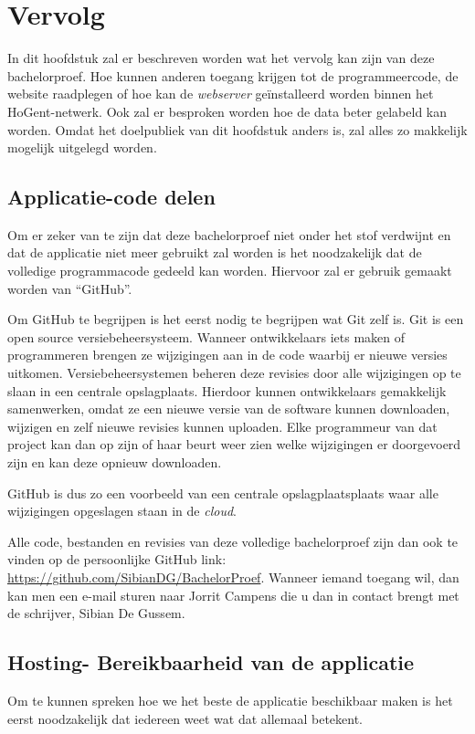 \chapter{Vervolg}
\label{ch:vervolg}

In dit hoofdstuk zal er beschreven worden wat het vervolg kan zijn van deze bachelorproef. Hoe kunnen anderen toegang krijgen tot de programmeercode, de website raadplegen of hoe kan de \textit{webserver} geïnstalleerd worden binnen het HoGent-netwerk. Ook zal er besproken worden hoe de data beter gelabeld kan worden. Omdat het doelpubliek van dit hoofdstuk anders is, zal alles zo makkelijk mogelijk uitgelegd worden.

\section{Applicatie-code delen}
Om er zeker van te zijn dat deze bachelorproef niet onder het stof verdwijnt en dat de applicatie niet meer gebruikt zal worden is het noodzakelijk dat de volledige programmacode gedeeld kan worden. Hiervoor zal er gebruik gemaakt worden van ``GitHub''.

Om GitHub te begrijpen is het eerst nodig te begrijpen wat Git zelf is. Git is een open source versiebeheersysteem. Wanneer ontwikkelaars iets maken of programmeren brengen ze wijzigingen aan in de code waarbij er nieuwe versies uitkomen. Versiebeheersystemen beheren deze revisies door alle wijzigingen op te slaan in een centrale opslagplaats. Hierdoor kunnen ontwikkelaars gemakkelijk samenwerken, omdat ze een nieuwe versie van de software kunnen downloaden, wijzigen en zelf nieuwe revisies kunnen uploaden. Elke programmeur van dat project kan dan op zijn of haar beurt weer zien welke wijzigingen er doorgevoerd zijn en kan deze opnieuw downloaden.~\autocite{Brown2019}

GitHub is dus zo een voorbeeld van een centrale opslagplaatsplaats waar alle wijzigingen opgeslagen staan in de \textit{cloud}.

Alle code, bestanden en revisies van deze volledige bachelorproef zijn dan ook te vinden op de persoonlijke GitHub link: \url{https://github.com/SibianDG/BachelorProef}. Wanneer iemand toegang wil, dan kan men een e-mail sturen naar Jorrit Campens die u dan in contact brengt met de schrijver, Sibian De Gussem.

\section{Hosting- Bereikbaarheid van de applicatie}
Om te kunnen spreken hoe we het beste de applicatie beschikbaar maken is het eerst noodzakelijk dat iedereen weet wat dat allemaal betekent.

